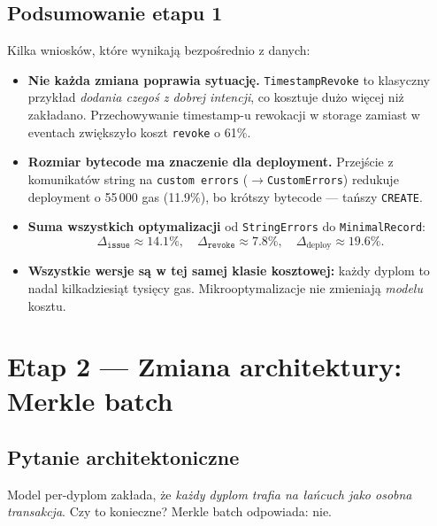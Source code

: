 \documentclass[11pt,a4paper]{article}
\begin{document}
\subsection{Podsumowanie etapu 1}

Kilka wniosków, które wynikają bezpośrednio z danych:

\begin{itemize}
  \item \textbf{Nie każda zmiana poprawia sytuację.}
        \texttt{TimestampRevoke} to klasyczny przykład \emph{dodania czegoś
        z dobrej intencji}, co kosztuje dużo więcej niż zakładano.
        Przechowywanie timestamp-u rewokacji w storage zamiast w eventach
        zwiększyło koszt \texttt{revoke} o 61\%.

  \item \textbf{Rozmiar bytecode ma znaczenie dla deployment.}
        Przejście z komunikatów string na \texttt{custom errors} ($\to$\texttt{CustomErrors})
        redukuje deployment o 55\,000 gas (11.9\%), bo krótszy bytecode
        --- tańszy \texttt{CREATE}.

  \item \textbf{Suma wszystkich optymalizacji} od \texttt{StringErrors} do \texttt{MinimalRecord}:
        \[
          \Delta_{\texttt{issue}} \approx 14.1\%,\quad
          \Delta_{\texttt{revoke}} \approx 7.8\%,\quad
          \Delta_{\text{deploy}} \approx 19.6\%.
        \]

  \item \textbf{Wszystkie wersje są w tej samej klasie kosztowej:}
        każdy dyplom to nadal kilkadziesiąt tysięcy gas.
        Mikrooptymalizacje nie zmieniają \emph{modelu} kosztu.
\end{itemize}

\section{Etap 2 --- Zmiana architektury: Merkle batch}

\subsection{Pytanie architektoniczne}

Model per-dyplom zakłada, że \emph{każdy dyplom trafia na łańcuch jako osobna transakcja}.
Czy to konieczne? Merkle batch odpowiada: nie.
\end{document}
